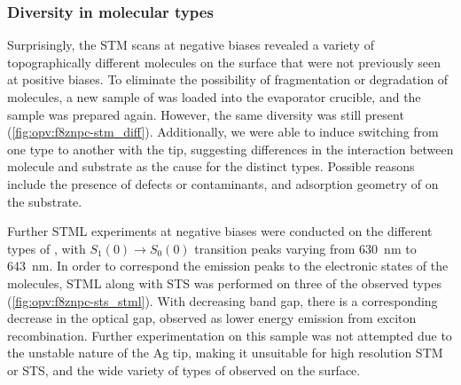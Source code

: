 \subsubsection*{Diversity in molecular types}


Surprisingly, the \ac{STM} scans at negative biases revealed a variety of topographically different molecules on the surface that were not previously seen at positive biases. To eliminate the possibility of fragmentation or degradation of molecules, a new sample of  was loaded into the evaporator crucible, and the sample was prepared again. However, the same diversity was still present (\autoref{fig:opv:f8znpc-stm_diff}). Additionally, we were able to induce switching from one type to another with the tip, suggesting differences in the interaction between molecule and substrate as the cause for the distinct types. Possible reasons include the presence of defects or contaminants, and adsorption geometry of  on the substrate.


\begin{figure} [h]
    \centering
    \caption{}
    \label{fig:opv:f8znpc-stm_diff}
\end{figure}

Further \ac{STML} experiments at negative biases were conducted on the different types of , with $S_1(0) \rightarrow S_0(0)$ transition peaks varying from \SI{630}{nm} to \SI{643}{nm}. In order to correspond the emission peaks to the electronic states of the molecules, \ac{STML} along with \ac{STS} was performed on three of the observed types (\autoref{fig:opv:f8znpc-sts_stml}). With decreasing band gap, there is a corresponding decrease in the optical gap, observed as lower energy emission from exciton recombination. Further experimentation on this sample was not attempted due to the unstable nature of the Ag tip, making it unsuitable for high resolution \ac{STM} or \ac{STS}, and the wide variety of types of  observed on the surface. 


\begin{figure} [h]
    \centering
    \caption{}
    \label{fig:opv:f8znpc-sts_stml}
\end{figure}



